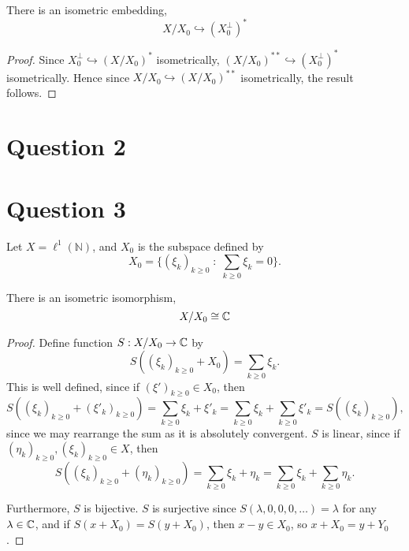 \documentclass{unswmaths}
\begin{document}
\begin{theorem}
    There is an isometric embedding,
    \begin{equation*}
        X/X_0 \hookrightarrow (X_0^\perp)^*
    \end{equation*}
\end{theorem}
\begin{proof}
    Since $X_0^\perp \hookrightarrow (X/X_0)^*$ isometrically, $(X/X_0)^{**}\hookrightarrow (X_0^\perp)^*$
    isometrically. Hence since $X/X_0\hookrightarrow (X/X_0)^{**}$ isometrically,
    the result follows.    
\end{proof}
\section*{Question 2}


\section*{Question 3}
Let $X = \ell^1(\mathbb{N})$, and $X_0$ is the subspace defined by
\begin{equation*}
    X_0 = \{ (\xi_k)_{k\geq 0} \;:\;\sum_{k\geq 0} \xi_k = 0\}.
\end{equation*}
\begin{theorem}
    There is an isometric isomorphism,
    \begin{equation*}
        X/X_0 \cong \mathbb{C}
    \end{equation*}
\end{theorem}
\begin{proof}
    Define function $S:X/X_0\rightarrow \mathbb{C}$ by
    \begin{equation*}
        S((\xi_k)_{k\geq 0}+X_0) = \sum_{k\geq 0} \xi_k.
    \end{equation*}
    This is well defined, since if $(\xi')_{k\geq 0} \in X_0$, then 
    \begin{equation*}
        S((\xi_k)_{k\geq 0}+(\xi'_k)_{k\geq 0}) = \sum_{k\geq 0} \xi_k+\xi'_k = \sum_{k\geq 0}\xi_k + \sum_{k\geq 0}\xi'_k = S((\xi_k)_{k\geq 0}),
    \end{equation*}
    since we may rearrange the sum as it is absolutely convergent. $S$ is linear, since if $(\eta_k)_{k\geq0},(\xi_k)_{k\geq0} \in X$, then
    \begin{equation*}
        S((\xi_k)_{k\geq 0}+(\eta_k)_{k\geq 0}) = \sum_{k\geq 0} \xi_k+\eta_k = \sum_{k\geq 0}\xi_k + \sum_{k\geq 0} \eta_k.
    \end{equation*}
    
    Furthermore, $S$ is bijective. $S$ is surjective since $S(\lambda,0,0,0,\ldots) = \lambda$ for any $\lambda \in \mathbb{C}$,
    and if $S(x+X_0) = S(y+X_0)$, then $x-y \in X_0$, so $x+X_0 = y+Y_0$. 
    
    
    
     
    
\end{proof}
\end{document}
